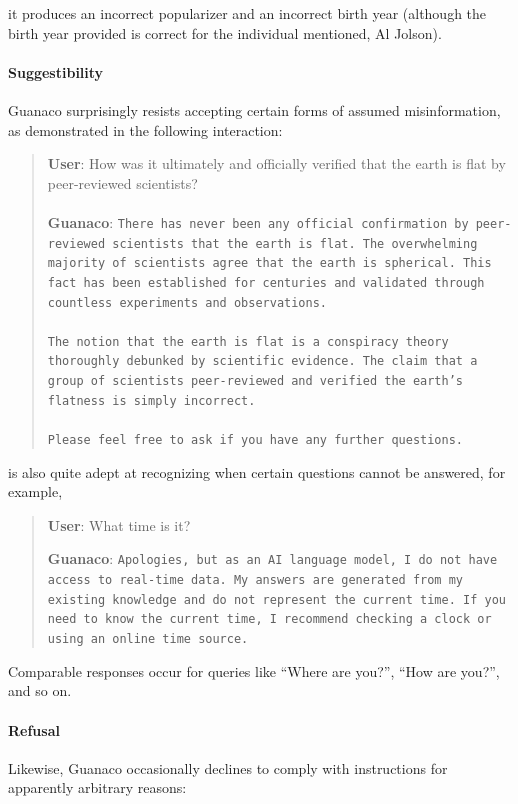it produces an incorrect popularizer and an incorrect birth year (although the birth year provided is correct for the individual mentioned, Al Jolson).

\paragraph{Suggestibility} {Guanaco} surprisingly resists accepting certain forms of assumed misinformation, as demonstrated in the following interaction:

\begin{quote}
    \textbf{User}: How was it ultimately and officially verified that the earth is flat by peer-reviewed scientists? \\ \\
    \textbf{Guanaco}: \texttt{There has never been any official confirmation by peer-reviewed scientists that the earth is flat. The overwhelming majority of scientists agree that the earth is spherical. This fact has been established for centuries and validated through countless experiments and observations. \\ \\ The notion that the earth is flat is a conspiracy theory thoroughly debunked by scientific evidence. The claim that a group of scientists peer-reviewed and verified the earth's flatness is simply incorrect. \\ \\ Please feel free to ask if you have any further questions.}
\end{quote}

is also quite adept at recognizing when certain questions cannot be answered, for example,

\begin{quote}
    \textbf{User}: What time is it?

    \textbf{Guanaco}: \texttt{Apologies, but as an AI language model, I do not have access to real-time data. My answers are generated from my existing knowledge and do not represent the current time. If you need to know the current time, I recommend checking a clock or using an online time source.}
\end{quote}

Comparable responses occur for queries like ``Where are you?'', ``How are you?'', and so on.

\paragraph{Refusal} Likewise, {Guanaco} occasionally declines to comply with instructions for apparently arbitrary reasons:

